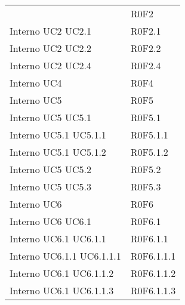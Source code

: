 \begin{longtable}{p{2.5cm}!{\VRule[1pt]}p{2.5cm}}
 & R0F2 \\
Interno \newline UC2
 \newline UC2.1
 & R0F2.1 \\
Interno \newline UC2
 \newline UC2.2
 & R0F2.2 \\
Interno \newline UC2
 \newline UC2.4
 & R0F2.4 \\
Interno \newline UC4
 & R0F4 \\
Interno \newline UC5
 & R0F5 \\
Interno \newline UC5
 \newline UC5.1
 & R0F5.1 \\
Interno \newline UC5.1
 \newline UC5.1.1
 & R0F5.1.1 \\
Interno \newline UC5.1
 \newline UC5.1.2
 & R0F5.1.2 \\
Interno \newline UC5
 \newline UC5.2
 & R0F5.2 \\
Interno \newline UC5
 \newline UC5.3
 & R0F5.3 \\
Interno \newline UC6
 & R0F6 \\
Interno \newline UC6
 \newline UC6.1
 & R0F6.1 \\
Interno \newline UC6.1
 \newline UC6.1.1
 & R0F6.1.1 \\
Interno \newline UC6.1.1
 \newline UC6.1.1.1
 & R0F6.1.1.1 \\
Interno \newline UC6.1
 \newline UC6.1.1.2
 & R0F6.1.1.2 \\
Interno \newline UC6.1
 \newline UC6.1.1.3
 & R0F6.1.1.3 \\

\end{longtable}
